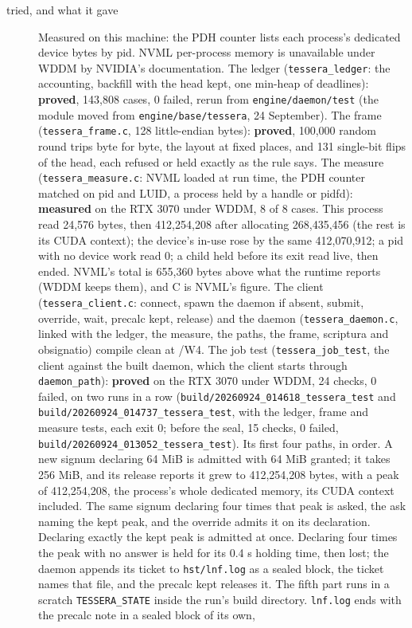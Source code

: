 \begin{description}
\item[{tried, and what it gave}] Measured on this machine: the PDH counter lists each process's dedicated device bytes by pid. NVML per-process memory is unavailable under WDDM by NVIDIA's documentation. The ledger (\texttt{tessera\_\allowbreak{}ledger}: the accounting, backfill with the head kept, one min-heap of deadlines): \textbf{proved}, 143,808 cases, 0 failed, rerun from \texttt{engine/\allowbreak{}daemon/\allowbreak{}test} (the module moved from \texttt{engine/\allowbreak{}base/\allowbreak{}tessera}, 24 September). The frame (\texttt{tessera\_\allowbreak{}frame.\allowbreak{}c}, 128 little-endian bytes): \textbf{proved}, 100,000 random round trips byte for byte, the layout at fixed places, and 131 single-bit flips of the head, each refused or held exactly as the rule says. The measure (\texttt{tessera\_\allowbreak{}measure.\allowbreak{}c}: NVML loaded at run time, the PDH counter matched on pid and LUID, a process held by a handle or pidfd): \textbf{measured} on the RTX 3070 under WDDM, 8 of 8 cases. This process read 24,576 bytes, then 412,254,208 after allocating 268,435,456 (the rest is its CUDA context); the device's in-use rose by the same 412,070,912; a pid with no device work read 0; a child held before its exit read live, then ended. NVML's total is 655,360 bytes above what the runtime reports (WDDM keeps them), and C is NVML's figure. The client (\texttt{tessera\_\allowbreak{}client.\allowbreak{}c}: connect, spawn the daemon if absent, submit, override, wait, precalc kept, release) and the daemon (\texttt{tessera\_\allowbreak{}daemon.\allowbreak{}c}, linked with the ledger, the measure, the paths, the frame, scriptura and obsignatio) compile clean at /W4. The job test (\texttt{tessera\_\allowbreak{}job\_\allowbreak{}test}, the client against the built daemon, which the client starts through \texttt{daemon\_\allowbreak{}path}): \textbf{proved} on the RTX 3070 under WDDM, 24 checks, 0 failed, on two runs in a row (\texttt{build/\allowbreak{}20260924\_\allowbreak{}014618\_\allowbreak{}tessera\_\allowbreak{}test} and \texttt{build/\allowbreak{}20260924\_\allowbreak{}014737\_\allowbreak{}tessera\_\allowbreak{}test}, with the ledger, frame and measure tests, each exit 0; before the seal, 15 checks, 0 failed, \texttt{build/\allowbreak{}20260924\_\allowbreak{}013052\_\allowbreak{}tessera\_\allowbreak{}test}). Its first four paths, in order. A new signum declaring 64 MiB is admitted with 64 MiB granted; it takes 256 MiB, and its release reports it grew to 412,254,208 bytes, with a peak of 412,254,208, the process's whole dedicated memory, its CUDA context included. The same signum declaring four times that peak is asked, the ask naming the kept peak, and the override admits it on its declaration. Declaring exactly the kept peak is admitted at once. Declaring four times the peak with no answer is held for its 0.4 s holding time, then lost; the daemon appends its ticket to \texttt{hst/\allowbreak{}lnf.\allowbreak{}log} as a sealed block, the ticket names that file, and the precalc kept releases it. The fifth part runs in a scratch \texttt{TESSERA\_\allowbreak{}STATE} inside the run's build directory. \texttt{lnf.\allowbreak{}log} ends with the precalc note in a sealed block of its own, 
\end{description}
